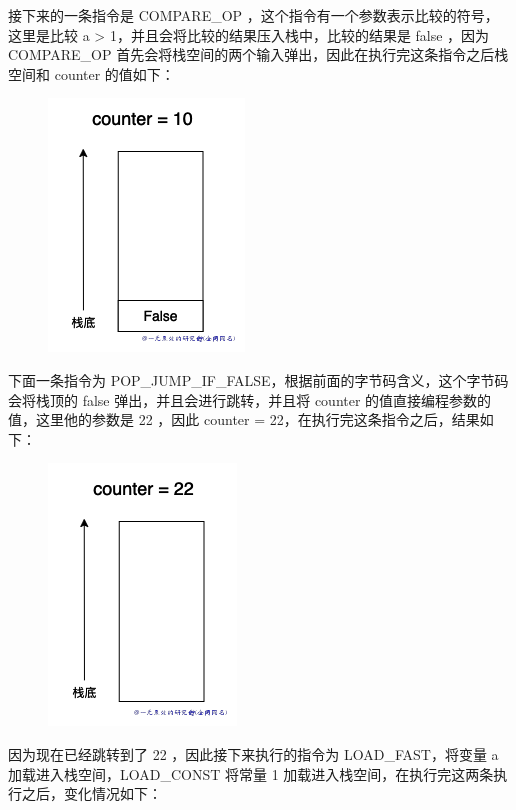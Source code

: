 接下来的一条指令是 COMPARE\_OP ，这个指令有一个参数表示比较的符号，这里是比较 a > 1，并且会将比较的结果压入栈中，比较的结果是 false ，因为 COMPARE\_OP 首先会将栈空间的两个输入弹出，因此在执行完这条指令之后栈空间和 counter 的值如下：

    \begin{figure}[H]
        \centering
            \includegraphics[scale=.25]{images/60-bytecode.png}
						\caption{ }
        \label{fig:my_label}
    \end{figure}
    
下面一条指令为 POP\_JUMP\_IF\_FALSE，根据前面的字节码含义，这个字节码会将栈顶的 false 弹出，并且会进行跳转，并且将 counter 的值直接编程参数的值，这里他的参数是 22 ，因此 counter = 22，在执行完这条指令之后，结果如下：

    \begin{figure}[H]
        \centering
            \includegraphics[scale=.25]{images/61-bytecode.png}
						\caption{ }
        \label{fig:my_label}
    \end{figure}
    
因为现在已经跳转到了 22 ，因此接下来执行的指令为 LOAD\_FAST，将变量 a 加载进入栈空间，LOAD\_CONST 将常量 1 加载进入栈空间，在执行完这两条执行之后，变化情况如下：

